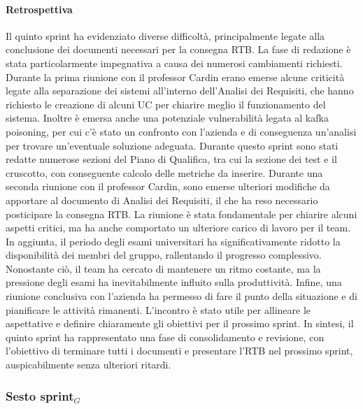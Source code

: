 \documentclass[10pt]{article}
\begin{document}
{{{{{{    \paragraph{Retrospettiva}\mbox{}\vspace{0.4em}

    Il quinto sprint ha evidenziato diverse difficoltà, principalmente legate alla conclusione dei documenti necessari per la consegna RTB. La fase di redazione è stata particolarmente impegnativa a causa dei numerosi cambiamenti richiesti.
    Durante la prima riunione con il professor Cardin erano emerse alcune criticità legate alla separazione dei sistemi all'interno dell'Analisi dei Requisiti, che hanno richiesto le creazione di alcuni UC per chiarire meglio il funzionamento del sistema. 
    Inoltre è emersa anche una potenziale vulnerabilità legata al kafka poisoning, per cui c'è stato un confronto con l'azienda e di conseguenza un'analisi per trovare un'eventuale soluzione adeguata.
    Durante questo sprint sono stati redatte numerose sezioni del Piano di Qualifica, tra cui la sezione dei test e  il cruscotto, con conseguente calcolo delle metriche da inserire.
    Durante una seconda riunione con il professor Cardin, sono emerse ulteriori modifiche da apportare al documento di Analisi dei Requisiti, il che ha reso necessario posticipare la consegna RTB. 
    La riunione è stata fondamentale per chiarire alcuni aspetti critici, ma ha anche comportato un ulteriore carico di lavoro per il team.
    In aggiunta, il periodo degli esami universitari ha significativamente ridotto la disponibilità dei membri del gruppo, rallentando il progresso complessivo. 
    Nonostante ciò, il team ha cercato di mantenere un ritmo costante, ma la pressione degli esami ha inevitabilmente influito sulla produttività.
    Infine, una riunione conclusiva con l'azienda ha permesso di fare il punto della situazione e di pianificare le attività rimanenti. L'incontro è stato utile per allineare le aspettative e definire chiaramente gli obiettivi per il prossimo sprint. 
    In sintesi, il quinto sprint ha rappresentato una fase di consolidamento e revisione, con l'obiettivo di terminare tutti i documenti e presentare l'RTB nel prossimo sprint, auspicabilmente senza ulteriori ritardi.



\newpage
\subsubsection{Sesto sprint$_G$}
\label{sesto-sprint$_G$}
    
}}}}}}
\end{document}
